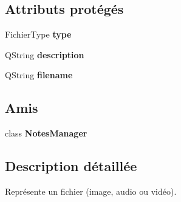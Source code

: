 \subsection*{Attributs protégés}
\begin{DoxyCompactItemize}
\item 
\hypertarget{class_fichier_af114aab83c1ffc271f2eeb91b8947b15}{Fichier\-Type {\bfseries type}}\label{class_fichier_af114aab83c1ffc271f2eeb91b8947b15}

\item 
\hypertarget{class_fichier_a6d157ead0d4cde6d7cf1f8723dc52d46}{Q\-String {\bfseries description}}\label{class_fichier_a6d157ead0d4cde6d7cf1f8723dc52d46}

\item 
\hypertarget{class_fichier_adf194796fa81d9d971a6b2ab793c8b29}{Q\-String {\bfseries filename}}\label{class_fichier_adf194796fa81d9d971a6b2ab793c8b29}

\end{DoxyCompactItemize}
\subsection*{Amis}
\begin{DoxyCompactItemize}
\item 
\hypertarget{class_fichier_a017a5144e8cfa6087305055ab968ef41}{class {\bfseries Notes\-Manager}}\label{class_fichier_a017a5144e8cfa6087305055ab968ef41}

\end{DoxyCompactItemize}


\subsection{Description détaillée}
Représente un fichier (image, audio ou vidéo). 

